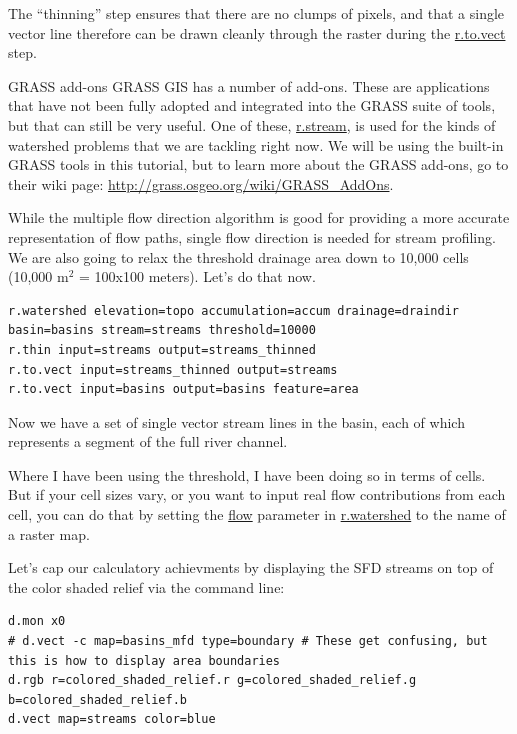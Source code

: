 \documentclass{book}
\begin{document}
The ``thinning'' step ensures that there are no clumps of pixels, and that a single vector line therefore can be drawn cleanly through the raster during the \url{r.to.vect} step.

\begin{boxx}[!ht]
\begin{bclogo}[arrondi = 0.1, logo = \bcrosevents]{GRASS add-ons}
GRASS GIS has a number of add-ons. These are applications that have not been fully adopted and integrated into the GRASS suite of tools, but that can still be very useful. One of these, \url{r.stream}, is used for the kinds of watershed problems that we are tackling right now. We will be using the built-in GRASS tools in this tutorial, but to learn more about the GRASS add-ons, go to their wiki page: \url{http://grass.osgeo.org/wiki/GRASS_AddOns}.
\end{bclogo}
\caption{GRASS add-ons}
\end{boxx}


While the multiple flow direction algorithm is good for providing a more accurate representation of flow paths, single flow direction is needed for stream profiling. We are also going to relax the threshold drainage area down to 10,000 cells (10,000 m$^2$ = 100x100 meters). Let's do that now.

\begin{lstlisting}
r.watershed elevation=topo accumulation=accum drainage=draindir basin=basins stream=streams threshold=10000
r.thin input=streams output=streams_thinned
r.to.vect input=streams_thinned output=streams
r.to.vect input=basins output=basins feature=area
\end{lstlisting}

Now we have a set of single vector stream lines in the basin, each of which represents a segment of the full river channel.

Where I have been using the threshold, I have been doing so in terms of cells. But if your cell sizes vary, or you want to input real flow contributions from each cell, you can do that by setting the \url{flow} parameter in \url{r.watershed} to the name of a raster map.

Let's cap our calculatory achievments by displaying the SFD streams on top of the color shaded relief via the command line:

\begin{lstlisting}
d.mon x0
# d.vect -c map=basins_mfd type=boundary # These get confusing, but this is how to display area boundaries
d.rgb r=colored_shaded_relief.r g=colored_shaded_relief.g b=colored_shaded_relief.b
d.vect map=streams color=blue
\end{lstlisting}
\end{document}
